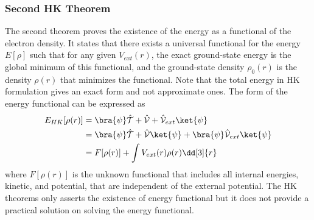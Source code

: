     \subsubsection{Second HK Theorem}
    The second theorem proves the existence of the energy as a functional of the electron density. It states that there exists a universal functional for the energy $E[\rho]$ such that for any given $V_{ext}(r)$, the exact ground-state energy is the global minimum of this functional, and the ground-state density $\rho_0(r)$ is the density $\rho(r)$ that minimizes the functional. Note that the total energy in HK formulation gives an exact form and not approximate ones. The form of the energy functional  can be expressed as 
    \begin{align}
        E_{HK} [\rho(r)] &= \bra{\psi} \hat{\mathcal{T}} + \hat{\mathcal{V}} + \hat{\mathcal{V}}_{ext} \ket{\psi}  \\
        &= \bra{\psi} \hat{\mathcal{T}} + \hat{\mathcal{V}} \ket{\psi}  + \bra{\psi} \hat{\mathcal{V}}_{ext} \ket{\psi} \\
         &= F[\rho(r)] + \int V_{ext}(r) \rho(r) \dd[3]{r}
    \end{align}
    where $F[\rho(r)]$ is the unknown functional that includes all internal energies, kinetic, and potential, that are independent of the external potential. The HK theorems only asserts  the existence of energy functional but it does not provide a practical solution on solving the energy functional.  

